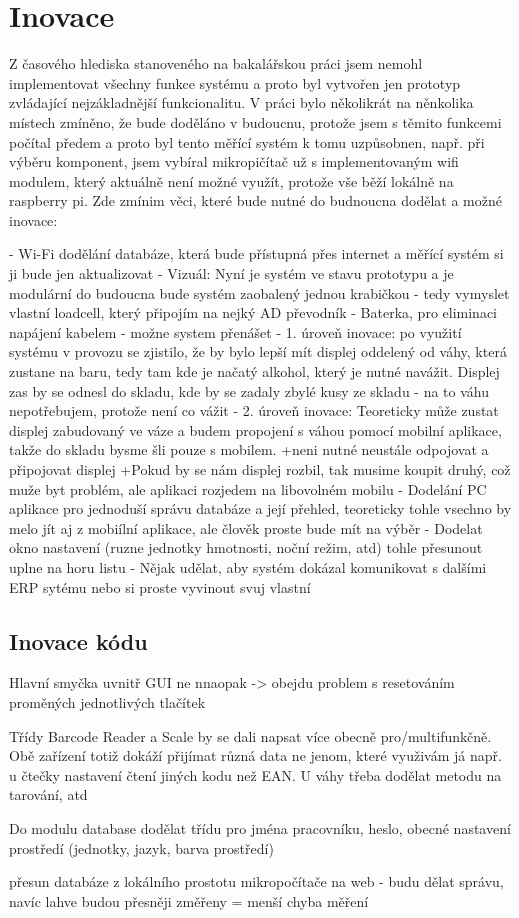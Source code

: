 \chapter{Inovace}
Z časového hlediska stanoveného na bakalářskou práci jsem nemohl implementovat všechny funkce systému a proto byl vytvořen jen prototyp zvládající nejzákladnější funkcionalitu.
V práci bylo několikrát na něnkolika místech zmíněno, že bude doděláno v budoucnu, protože jsem s těmito funkcemi počítal předem a proto byl tento měřící systém k tomu uzpůsobnen, např. při výběru komponent, jsem vybíral mikropičítač už s implementovaným wifi modulem, který aktuálně není možné využít, protože vše běží lokálně na raspberry pi.
Zde zmínim věci, které bude nutné do budnoucna dodělat a možné inovace:

- Wi-Fi dodělání databáze, která bude přístupná přes internet a měřící systém si ji bude jen aktualizovat
- Vizuál: Nyní je systém ve stavu prototypu a je modulární do budoucna bude systém zaobalený jednou krabičkou - tedy vymyslet vlastní loadcell, který připojím na nejký AD převodník
- Baterka, pro eliminaci napájení kabelem - možne system přenášet 
- 1. úroveň inovace: po využití systému v provozu se zjistilo, že by bylo lepší mít displej oddelený od váhy, která zustane na baru, tedy tam kde je načatý alkohol, který je nutné navážit. Displej zas by se odnesl do skladu, kde by se zadaly zbylé kusy ze skladu - na to váhu nepotřebujem, protože není co vážit
- 2. úroveň inovace: Teoreticky může zustat displej zabudovaný ve váze a budem propojení s váhou pomocí mobilní aplikace, takže do skladu bysme šli pouze s mobilem.
    +neni nutné neustále odpojovat a připojovat displej
    +Pokud by se nám displej rozbil, tak musime koupit druhý, což muže byt problém, ale aplikaci rozjedem na libovolném mobilu
- Dodelání PC aplikace pro jednoduší správu databáze a její přehled, teoreticky tohle vsechno by melo jít aj z mobiílní aplikace, ale člověk proste bude mít na výběr 
- Dodelat okno nastavení (ruzne jednotky hmotnosti, noční režim, atd) tohle přesunout uplne na horu listu
- Nějak udělat, aby systém dokázal komunikovat s dalšími ERP sytému nebo si proste vyvinout svuj vlastní

\section{Inovace kódu}

Hlavní smyčka uvnitř GUI ne nnaopak -> obejdu problem s resetováním proměných jednotlivých tlačítek

Třídy Barcode Reader a Scale by se dali napsat více obecně pro/multifunkčně. Obě zařízení totiž dokáží přijímat různá data ne jenom, které využivám já např. u čtečky nastavení čtení jiných kodu než EAN. U váhy třeba dodělat metodu na tarování, atd

Do modulu database dodělat třídu pro jména pracovníku, heslo, obecné nastavení prostředí (jednotky, jazyk, barva prostředí)

přesun databáze z lokálního prostotu mikropočítače na web - budu dělat správu, navíc lahve budou přesněji změřeny = menší chyba měření 
